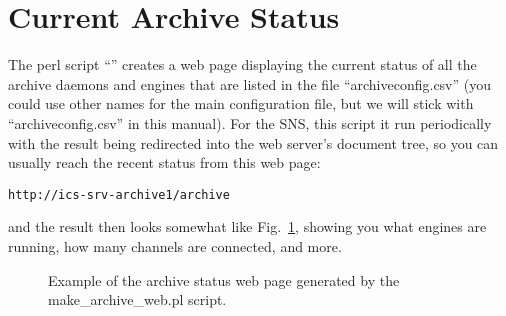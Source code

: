 \section{Current Archive Status}
The perl script ``'' creates a web page
displaying the current status of all the archive daemons and engines
that are listed in the file ``archiveconfig.csv''
(you could use other names for the main configuration file, but we
will stick with ``archiveconfig.csv'' in this manual).
For the SNS, this script it run periodically with the result being
redirected into the web server's document tree, so you can usually
reach the recent status from this web page:
\begin{lstlisting}[frame=none,keywordstyle=\sffamily]
    http://ics-srv-archive1/archive
\end{lstlisting}
\noindent and the result then looks somewhat like
Fig.~\ref{fig:archcfgstat}, showing you what engines are running, how
many channels are connected, and more.

\medskip

\begin{figure}[htb]
\begin{center}
\end{center}
\caption{\label{fig:archcfgstat}Example of the archive status web page
  generated by the make\_archive\_web.pl script.}
\end{figure}


